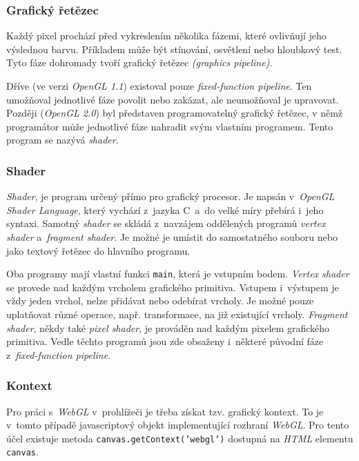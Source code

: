 \documentclass[a4paper,12pt]{article}
\def\code#1{\texttt{#1}}
\begin{document}
\subsubsection{Grafický řetězec}

Každý pixel prochází před vykreslením několika fázemi, které ovlivňují jeho výslednou barvu. Příkladem může být stínování, osvětlení nebo hloubkový test. Tyto fáze dohromady tvoří grafický řetězec \textit{(graphics pipeline)}.~\cite{graphic}

Dříve (ve verzi \textit{OpenGL 1.1}) existoval pouze \textit{fixed-function pipeline}. Ten umožňoval jednotlivé fáze povolit nebo zakázat, ale neumožňoval je upravovat. Později (\textit{OpenGL 2.0}) byl představen programovatelný grafický řetězec, v němž programátor může jednotlivé fáze nahradit svým vlastním programem. Tento program se nazývá \textit{shader}.~\cite{graphic}

\subsubsection{Shader}

\textit{Shader}, je program určený přímo pro grafický procesor. Je napsán v~\textit{OpenGL Shader Language}, který vychází z~jazyka C~a~do velké míry přebírá i~jeho syntaxi. Samotný \textit{shader} se skládá z~navzájem oddělených programů \textit{vertex shader} a~\textit{fragment shader}. Je možné je umístit do samostatného souboru nebo jako textový řetězec do hlavního programu.~\cite{graphic}

Oba programy mají vlastní funkci \code{main}, která je vstupním bodem. \textit{Vertex shader} se provede nad každým vrcholem grafického primitiva. Vstupem i~výstupem je vždy jeden vrchol, nelze přidávat nebo odebírat vrcholy. Je možné pouze uplatňovat různé operace, např. transformace, na již existující vrcholy. \textit{Fragment shader}, někdy také \textit{pixel shader}, je prováděn nad každým pixelem grafického primitiva. Vedle těchto programů jsou zde obsaženy i~některé původní fáze z~\textit{fixed-function pipeline}.~\cite{graphic}

\subsubsection{Kontext}

Pro práci s~\textit{WebGL} v~prohlížeči je třeba získat tzv. grafický kontext. To je v~tomto případě javascriptový objekt implementující rozhraní \textit{WebGL}. Pro tento účel existuje metoda \code{canvas.getContext('webgl')} dostupná na \textit{HTML} elementu \code{canvas}.~\cite{graphic}
\end{document}
